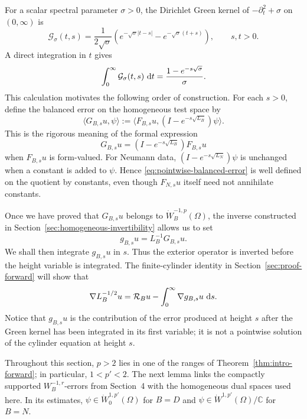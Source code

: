 \documentclass[12pt]{amsart}
\newcommand\dd{\,{\rm d}}
\theoremstyle{remark}
\begin{document}
For a scalar spectral parameter \(\sigma>0\), the Dirichlet Green kernel
of \(-\partial_t^2+\sigma\) on \((0,\infty)\) is
\[
 \mathcal G_\sigma(t,s)
 =\frac{1}{2\sqrt\sigma}
  \left(e^{-\sqrt\sigma|t-s|}-e^{-\sqrt\sigma(t+s)}\right),
 \qquad s,t>0.
\]
A direct integration in \(t\) gives
\[
 \int_0^\infty\mathcal G_\sigma(t,s)\,\dd t
 =\frac{1-e^{-s\sqrt\sigma}}{\sigma}.
\]
This calculation motivates the following order of construction.  For each \(s>0\), define the
balanced error on the homogeneous test space by
\begin{equation}\label{eq:pointwise-balanced-error}
 \langle G_{B,s}u,\psi\rangle
 :=\langle F_{B,s}u,(I-e^{-s\sqrt{L_B}})\psi\rangle.
\end{equation}
This is the rigorous meaning of the formal expression
\[
 G_{B,s}u=(I-e^{-s\sqrt{L_B}})F_{B,s}u
\]
when \(F_{B,s}u\) is form-valued.  For Neumann data,
\((I-e^{-s\sqrt{L_N}})\psi\) is unchanged when a constant is added to
\(\psi\).  Hence \eqref{eq:pointwise-balanced-error} is well defined on
the quotient by constants, even though \(F_{N,s}u\) itself need not
annihilate constants.

Once we have proved that \(G_{B,s}u\) belongs to
\(\dot W^{-1,p}_B(\Omega)\), the inverse constructed in
Section~\ref{sec:homogeneous-invertibility} allows us to set
\begin{equation}\label{eq:pointwise-correction}
 g_{B,s}u=L_B^{-1}G_{B,s}u.
\end{equation}
We shall then integrate \(g_{B,s}u\) in \(s\).  Thus the exterior
operator is inverted before the height variable is integrated.  The
finite-cylinder identity in Section~\ref{sec:proof-forward} will show that
\[
 \nabla L_B^{-1/2}u
 =\mathcal R_Bu-\int_0^\infty\nabla g_{B,s}u\,\dd s.
\]
Notice that
\(g_{B,s}u\) is the contribution of the error produced at height
\(s\) after the Green kernel has been integrated in its first variable;
it is not a pointwise solution of the cylinder equation at height \(s\).

Throughout this section, \(p>2\) lies in one of the ranges of Theorem~\ref{thm:intro-forward}; in particular, \(1<p'<2\). The next lemma links the compactly supported \(W_B^{-1,r}\)-errors from
Section~4 with the homogeneous dual spaces used here.  In its estimates,
\(\psi\in\dot W^{1,p'}_0(\Omega)\) for \(B=D\) and
\(\psi\in\dot W^{1,p'}(\Omega)/\mathbb C\) for \(B=N\).
\end{document}
